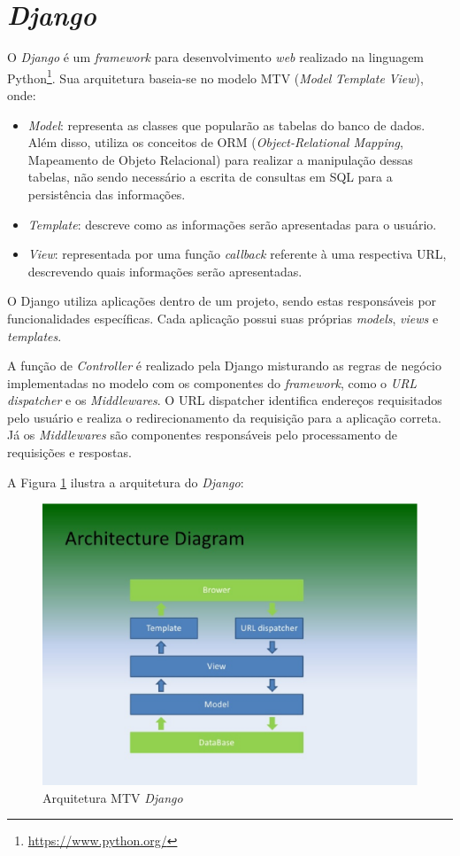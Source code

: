 \section{\textit{Django}}
O \textit{Django} \cite{django_project} é um \textit{framework} para desenvolvimento \textit{web} realizado na linguagem Python\footnote{\url{https://www.python.org/}}. Sua arquitetura baseia-se no modelo MTV (\textit{Model} \textit{Template} \textit{View}), onde:
\begin{itemize}
    \item \textit{Model}: representa as classes que popularão as tabelas do banco de dados. Além disso, utiliza os conceitos de ORM (\textit{Object-Relational Mapping}, Mapeamento de Objeto Relacional) para realizar a manipulação dessas tabelas, não sendo necessário a escrita de consultas em SQL para a persistência das informações.
    \item \textit{Template}: descreve como as informações serão apresentadas para o usuário.
    \item \textit{View}: representada por uma função \textit{callback} referente à uma respectiva URL, descrevendo quais informações serão apresentadas.
\end{itemize}

O Django utiliza aplicações dentro de um projeto, sendo estas responsáveis por funcionalidades específicas. Cada aplicação possui suas próprias \textit{models}, \textit{views} e \textit{templates}.

A função de \textit{Controller} é realizado pela Django misturando as regras de negócio implementadas no modelo com os componentes do \textit{framework}, como o \textit{URL dispatcher} e os \textit{Middlewares}. O URL dispatcher identifica endereços requisitados pelo usuário e realiza o redirecionamento da requisição para a aplicação correta. Já os \textit{Middlewares} são componentes responsáveis pelo processamento de requisições e respostas.

A Figura \ref{django-arq} ilustra a arquitetura do \textit{Django}:

\begin{figure}[h]
    \centering
    \includegraphics[keepaspectratio=true,scale=0.5]{figuras/django-arquitetura.eps}
    \caption{Arquitetura MTV \textit{Django}}
    \label{django-arq}
\end{figure}

